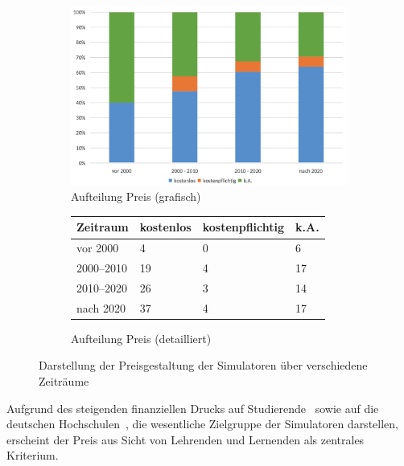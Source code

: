 \begin{figure}[!htbp]
    \centering
    \begin{subfigure}[b]{0.48\textwidth}
        \centering
        \includegraphics[width=\textwidth]{graphics_lit/15-preis-jahr.png}
        \caption{Aufteilung Preis (grafisch)}
        \label{fig:15-preis-jahr}
    \end{subfigure}
    \hfill
    \begin{subfigure}[b]{0.48\textwidth}
        \centering
        \tiny
        \begin{tabularx}{\textwidth}{lXXX}
            \hline
            \textbf{Zeitraum} & \textbf{kostenlos} & \textbf{kostenpflichtig} & \textbf{k.A.} \\
            \hline
            vor 2000      & 4  & 0 & 6  \\
            2000--2010    & 19 & 4 & 17 \\
            2010--2020    & 26 & 3 & 14 \\
            nach 2020     & 37 & 4 & 17 \\
            \hline
        \end{tabularx}
        \caption{Aufteilung Preis (detailliert)}
        \label{tab:15-preis-zeit}
    \end{subfigure}
    \caption{Darstellung der Preisgestaltung der Simulatoren über verschiedene Zeiträume}
    \label{fig:15-preis-gesamt}
\end{figure}

Aufgrund des steigenden finanziellen Drucks auf Studierende~\parencite[S.~1]{meier_bedeutung_2023} sowie auf die deutschen Hochschulen~\cite{von_stuckrad_hochschulfinanzierung_nodate}, die wesentliche Zielgruppe der Simulatoren darstellen, erscheint der Preis aus Sicht von Lehrenden und Lernenden als zentrales Kriterium.

